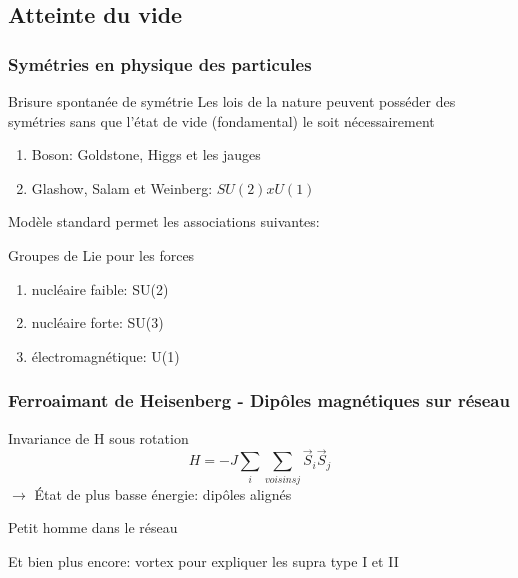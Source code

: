 \documentclass[handout]{beamer}
\begin{document}
\subsection{Atteinte du vide}
\begin{frame}
\frametitle{Symétries en physique des particules}
\begin{block}{Brisure spontanée de symétrie}
Les lois de la nature peuvent posséder des symétries sans que l'état de vide (fondamental) le soit nécessairement
\begin{enumerate}
\item Boson: Goldstone, Higgs et les jauges
\item Glashow, Salam et Weinberg: $SU(2)xU(1)$ 
\end{enumerate}
\end{block}
Modèle standard permet les associations suivantes:
\begin{block}{Groupes de Lie pour les forces}
\begin{enumerate}
\item nucléaire faible: SU(2)
\item nucléaire forte: SU(3)
\item électromagnétique: U(1)
\end{enumerate}
\end{block}
\end{frame}

\begin{frame}
\frametitle{Ferroaimant de Heisenberg - Dipôles magnétiques sur réseau}
Invariance de H sous rotation\\
\begin{equation*}
H= -J\sum_{i}{\sum_{voisins j}{\vec{S}_i\vec{S}_j}}
\end{equation*} 
$\rightarrow$ État de plus basse énergie: dipôles alignés \\
 \begin{figure}[0.5\textwidth]
 \end{figure}

\end{frame}

\begin{frame}
    \begin{figure}[0.3\textwidth]
    \end{figure}
    Petit homme dans le réseau
    
Et bien plus encore: vortex pour expliquer les supra type I et II
 \end{frame} 
\end{document}
